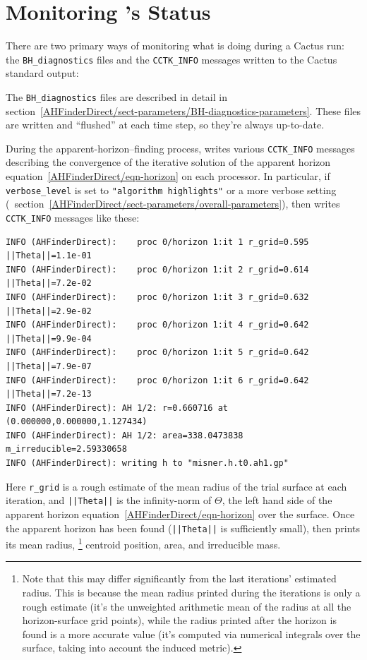 
\section{Monitoring 's Status}

There are two primary ways of monitoring what 
is doing during a Cactus run: the \verb|BH_diagnostics| files and the
\verb|CCTK_INFO| messages written to the Cactus standard output:

The \verb|BH_diagnostics| files are described in detail in
section~\ref{AHFinderDirect/sect-parameters/BH-diagnostics-parameters}.
These files are written and ``flushed'' at each time step, so they're
always up-to-date.

During the apparent-horizon--finding process, 
writes various \verb|CCTK_INFO| messages describing the convergence
of the iterative solution of the apparent horizon
equation~\ref{AHFinderDirect/eqn-horizon} on each processor.
In particular, if \verb|verbose_level| is set to
\verb|"algorithm highlights"| or a more verbose setting
(\cf{}~section~\ref{AHFinderDirect/sect-parameters/overall-parameters}),
then  writes \verb|CCTK_INFO| messages like
these:
\begin{verbatim}
INFO (AHFinderDirect):    proc 0/horizon 1:it 1 r_grid=0.595 ||Theta||=1.1e-01
INFO (AHFinderDirect):    proc 0/horizon 1:it 2 r_grid=0.614 ||Theta||=7.2e-02
INFO (AHFinderDirect):    proc 0/horizon 1:it 3 r_grid=0.632 ||Theta||=2.9e-02
INFO (AHFinderDirect):    proc 0/horizon 1:it 4 r_grid=0.642 ||Theta||=9.9e-04
INFO (AHFinderDirect):    proc 0/horizon 1:it 5 r_grid=0.642 ||Theta||=7.9e-07
INFO (AHFinderDirect):    proc 0/horizon 1:it 6 r_grid=0.642 ||Theta||=7.2e-13
INFO (AHFinderDirect): AH 1/2: r=0.660716 at (0.000000,0.000000,1.127434)
INFO (AHFinderDirect): AH 1/2: area=338.0473838 m_irreducible=2.59330658
INFO (AHFinderDirect): writing h to "misner.h.t0.ah1.gp"
\end{verbatim}
Here \verb|r_grid| is a rough estimate of the mean radius of
the trial surface at each iteration, and \verb:||Theta||: is the
infinity-norm of $\Theta$, the left hand side of the apparent
horizon equation~\ref{AHFinderDirect/eqn-horizon} over the surface.
Once the apparent horizon has been found
(\verb:||Theta||: is sufficiently small), then 
prints its mean radius,%
\footnote{%
	 Note that this may differ significantly from
	 the last iterations' estimated radius.  This
	 is because the mean radius printed during the
	 iterations is only a rough estimate (it's the
	 unweighted arithmetic mean of the radius at
	 all the horizon-surface grid points), while
	 the radius printed after the horizon is found
	 is a more accurate value (it's computed via
	 numerical integrals over the surface, taking
	 into account the induced metric).
	 }%
{} centroid position, area, and irreducible mass.

